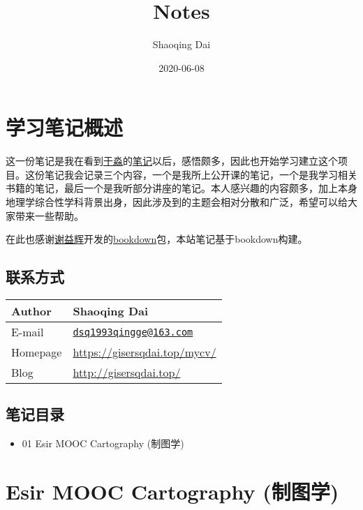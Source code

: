 \documentclass[]{book}
\title{Notes}
\author{Shaoqing Dai}
\date{2020-06-08}
\providecommand{\tightlist}{%
  \setlength{\itemsep}{0pt}\setlength{\parskip}{0pt}}
\begin{document}
\maketitle

{
\setcounter{tocdepth}{1}
\tableofcontents
}
\hypertarget{ux5b66ux4e60ux7b14ux8bb0ux6982ux8ff0}{%
\chapter*{学习笔记概述}\label{ux5b66ux4e60ux7b14ux8bb0ux6982ux8ff0}}

这一份笔记是我在看到\href{https://yufree.cn/}{于淼}的\href{http://yufree.github.io/notes/}{笔记}以后，感悟颇多，因此也开始学习建立这个项目。这份笔记我会记录三个内容，一个是我所上公开课的笔记，一个是我学习相关书籍的笔记，最后一个是我听部分讲座的笔记。本人感兴趣的内容颇多，加上本身地理学综合性学科背景出身，因此涉及到的主题会相对分散和广泛，希望可以给大家带来一些帮助。

在此也感谢\href{https://yihui.org/}{谢益辉}开发的\href{https://bookdown.org/}{bookdown}包\citep{xie2015}，本站笔记基于bookdown构建。

\hypertarget{ux8054ux7cfbux65b9ux5f0f}{%
\section*{联系方式}\label{ux8054ux7cfbux65b9ux5f0f}}

\begin{longtable}[]{@{}ll@{}}
\toprule
Author & Shaoqing Dai\tabularnewline
\midrule
\endhead
E-mail & \href{mailto:dsq1993qingge@163.com}{\nolinkurl{dsq1993qingge@163.com}}\tabularnewline
Homepage & \url{https://gisersqdai.top/mycv/}\tabularnewline
Blog & \url{http://gisersqdai.top/}\tabularnewline
\bottomrule
\end{longtable}

\hypertarget{ux7b14ux8bb0ux76eeux5f55}{%
\section*{笔记目录}\label{ux7b14ux8bb0ux76eeux5f55}}

\begin{itemize}
\tightlist
\item
  01 Esir MOOC Cartography (制图学)
\end{itemize}

\hypertarget{cartography}{%
\chapter{Esir MOOC Cartography (制图学)}\label{cartography}}


\end{document}
